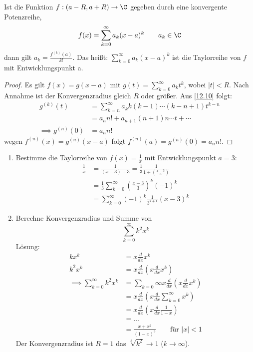 \documentclass{mycourse}
\begin{document}
\begin{kor}
\label{12.12}
Ist die Funktion $f:(a-R,a+R)\to \C$ gegeben durch eine konvergente Potenzreihe,
\[
f(x)=\sum_{k=0}^\infty a_k(x-a)^k \qquad a_k\in\C
\]
dann gilt $a_k=\frac{f^{(k)}(a)}{k!}$.
Das heißt: $\sum_{k=0}^\infty a_k(x-a)^k$ ist die Taylorreihe von $f$ mit Entwicklungspunkt a.
\begin{proof}
Es gilt $f(x)=g(x-a)$ mit $g(t)=\sum_{k=0}^\infty a_kt^k$, wobei $|t|<R$.
Nach Annahme ist der Konvergenzradius gleich $R$ oder größer.
Aus \ref{12.10} folgt:
\begin{align*}
g^{(k)}(t)&=\sum_{k=n}^\infty a_kk(k-1)\dotsb(k-n+1)t^{k-n}\\
&=a_nn!+a_{n+1}(n+1)n\dotsb t + \dotsb\\
\implies g^{(n)}(0)&=a_nn!
\end{align*}
wegen $f^{(n)}(x)=g^{(n)}(x-a)$ folgt $f^{(n)}(a)=g^{(n)}(0)=a_nn!$.
\end{proof}
\begin{ex*}
\begin{enumerate}
\item Bestimme die Taylorreihe von $f(x)=\frac 1x$ mit Entwicklungspunkt $a=3$:
\begin{align*}
\frac 1x&=\frac 1{(x-3)+3}=\frac 13 \frac 1{1+\left(\frac {x-3}3\right)}\\
&=\frac 13 \sum_{k=0}^\infty\left(\frac {x-3}3\right)^k(-1)^k\\
&=\sum_{k=0}^\infty(-1)^k\frac 1{3^{k+1}}(x-3)^k
\end{align*}
\item Berechne Konvergenzradius und Summe von
\[
\sum_{k=0}^\infty k^2x^k
\]
Lösung:
\begin{align*}
kx^k &= x\frac d{dx}x^k\\
k^2x^k &= x \frac d{dx}\left(x\frac d{dx}x^k\right)\\
\implies \sum_{k=0}^\infty k^2x^k &= \sum_{k=0}\infty x\frac d{dx}\left(x\frac d{dx}x^k\right)\\
&= x\frac d{dx}\left(x\frac d{dx}\sum_{k=0}^\infty x^k\right)\\
&= x\frac d{dx}\left(x\frac d{dx}\frac 1{1-x}\right)\\
&= \dotsc\\
&= \frac {x+x^2}{(1-x)^3} \qquad \text{für } |x|<1
\end{align*}
Der Konvergenzradius ist $R=1$ das $\sqrt[k]{k^2}\to 1$ ($k\to \infty$).
\end{enumerate}
\end{ex*}
\end{kor}
\end{document}
